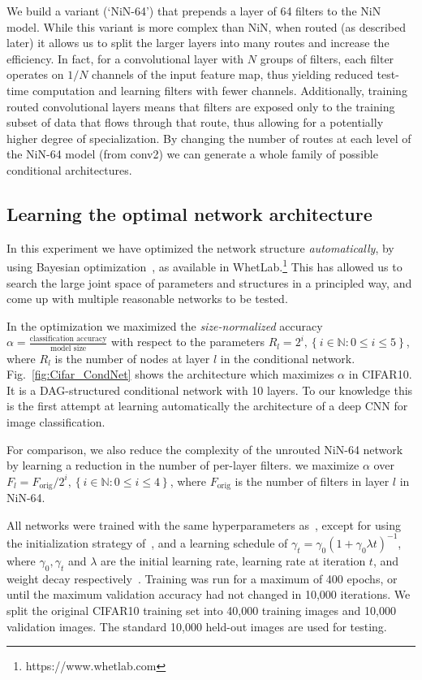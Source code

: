 \documentclass[thesis]{subfiles}
\begin{document}
We build a variant (`NiN-64') that prepends a layer of 64 filters to the NiN model.
While this variant is more complex than NiN, when routed (as described later) it allows us 
to split the larger layers into many routes and increase the efficiency.
In fact, for a convolutional layer with $N$ groups of filters, each filter operates on $1/N$ channels of the input feature map, thus yielding reduced test-time computation and learning filters with fewer channels. 
Additionally, training routed convolutional layers means that filters are exposed only to the training subset of data that flows through that route, thus allowing for a potentially higher degree of specialization.
By changing the number of routes at each level of the NiN-64 model (from conv2) we can 
generate a whole family of possible conditional architectures. 

\subsection{Learning the optimal network architecture}
In this experiment we have optimized the network structure {\em automatically}, 
by using Bayesian optimization~\cite{Snoek2012}, as available in WhetLab.\footnote{https://www.whetlab.com} 
This has allowed us to search the large joint space of parameters and structures in a principled way, 
and come up with multiple reasonable networks to be tested. 

In the optimization we maximized the {\em size-normalized} accuracy $\alpha =\frac{\textrm{classification accuracy}}{\textrm{model size}}$ with respect to the parameters $R_l = 2^i, \left\{i\in \mathbb{N} : 0 \le i \le 5\right\}$, where $R_l$ is the number of nodes at layer $l$ in the conditional network. 
Fig.~\ref{fig:Cifar_CondNet} shows the architecture which maximizes $\alpha$ in CIFAR10. 
It is a DAG-structured conditional network with 10 layers.
To our knowledge this is the first attempt at learning automatically the architecture of a deep CNN for image classification.

For comparison, we also reduce the complexity of the unrouted NiN-64 network by learning a reduction in the number of per-layer filters. 
\ie we maximize $\alpha$ over $F_l = F_\textrm{orig}/2^i, \left\{i\in \mathbb{N} : 0 \le i \le 4\right\}$, where $F_\textrm{orig}$ is the number of filters in layer $l$ in NiN-64. 

All networks were trained with the same hyperparameters as~\cite{Lin2013NiN}, 
except for using the initialization strategy of~\cite{He2015delving}, 
and a learning schedule of $\gamma_t = \gamma_0(1+\gamma_0\lambda t)^{-1}$, where $\gamma_0,\gamma_t$ and $\lambda$ are the initial learning rate, learning rate at iteration $t$, and weight decay respectively~\cite{Bottou2012sgdtricks}. Training was run for a maximum of 400 epochs, or until the maximum validation accuracy had not changed in 10,000 iterations. 
We split the original CIFAR10 training set into 40,000 training images and 
10,000 validation images. 
The standard 10,000 held-out images are used for testing.
\end{document}
